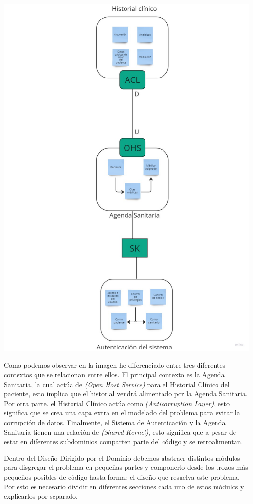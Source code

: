 \includegraphics{contextual_map.pdf}

Como podemos observar en la imagen he diferenciado entre tres diferentes contextos que se relacionan entre ellos.
El principal contexto es la Agenda Sanitaria, la cual actúa de \textit{(Open Host Service)} para el Historial Clínico del paciente,
esto implica que el historial vendrá alimentado por la Agenda Sanitaria. Por otra parte, el Historial Clínico actúa como
\textit{(Anticorruption Layer)}, esto significa que se crea una capa extra en el modelado del problema para evitar la corrupción
de datos. Finalmente,  el Sistema de Autenticación y la Agenda Sanitaria tienen una relación de \textit{(Shared Kernel)}, esto significa
que a pesar de estar en diferentes subdominios comparten parte del código y se retroalimentan.



Dentro del Diseño Dirigido por el Dominio debemos abstraer distintos módulos para disgregar el problema en pequeñas partes
y componerlo desde los trozos más pequeños posibles de código hasta formar el diseño que resuelva este problema.
Por esto es necesario dividir en diferentes secciones cada uno de estos módulos y explicarlos por separado.

